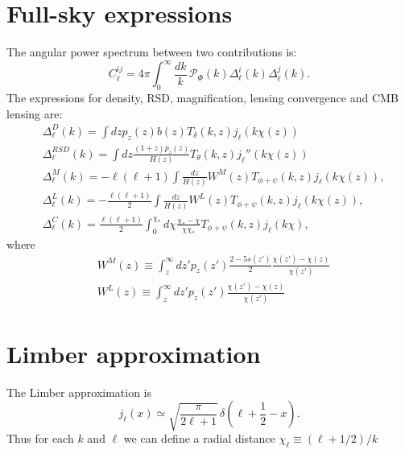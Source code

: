 \documentclass[a4paper,10pt]{article}
\begin{document}
\section{Full-sky expressions}
The angular power spectrum between two contributions is:
\begin{equation}
 C^{ij}_\ell=4\pi\int_0^\infty \frac{dk}{k}\,\mathcal{P}_\Phi(k)\Delta^i_\ell(k)\Delta^j_\ell(k).
\end{equation}
The expressions for density, RSD, magnification, lensing convergence and CMB lensing are:
\begin{align}
  &\Delta_\ell^D(k)=\int dz p_z(z) b(z) T_\delta(k,z) j_\ell(k\chi(z))\\
  &\Delta_\ell^{RSD}(k)=\int dz \frac{(1+z) p_z(z)}{H(z)}T_\theta(k,z) j_\ell''(k\chi(z))\\
  &\Delta_\ell^M(k)=-\ell(\ell+1)\int \frac{dz}{H(z)} W^M(z) T_{\phi+\psi}(k,z) j_\ell(k\chi(z)), \\ 
  &\Delta_\ell^L(k)=-\frac{\ell(\ell+1)}{2}\int \frac{dz}{H(z)} W^L(z) T_{\phi+\psi}(k,z) j_\ell(k\chi(z)),  \\
  &\Delta_\ell^C(k)=\frac{\ell(\ell+1)}{2}\int_0^{\chi_*}d\chi
  \frac{\chi_*-\chi}{\chi\chi_*} T_{\phi+\psi}(k,z) j_\ell(k\chi),  
\end{align}
where
\begin{align}
 &W^M(z)\equiv\int_z^\infty dz' p_z(z')\frac{2-5s(z')}{2}\frac{\chi(z')-\chi(z)}{\chi(z')}\\
 &W^L(z)\equiv\int_z^\infty dz' p_z(z')\frac{\chi(z')-\chi(z)}{\chi(z')}
\end{align}

\section{Limber approximation}
The Limber approximation is
\begin{equation}
 j_\ell(x)\simeq\sqrt{\frac{\pi}{2\ell+1}}\,\delta\left(\ell+\frac{1}{2}-x\right).
\end{equation}
Thus for each $k$ and $\ell$ we can define a radial distance $\chi_\ell\equiv(\ell+1/2)/k$
\end{document}
